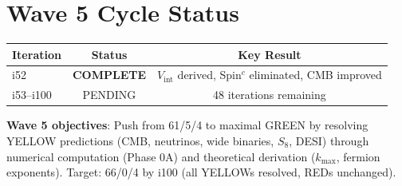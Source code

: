 \documentclass[11pt,a4paper]{article}
\begin{document}
\section{Wave 5 Cycle Status}

\begin{center}
\begin{tabular}{lcc}
\toprule
\textbf{Iteration} & \textbf{Status} & \textbf{Key Result} \\
\midrule
i52 & \textbf{COMPLETE} & $V_{\mathrm{int}}$ derived, Spin$^c$ eliminated, CMB improved \\
i53--i100 & PENDING & 48 iterations remaining \\
\bottomrule
\end{tabular}
\end{center}

\textbf{Wave 5 objectives}: Push from 61/5/4 to maximal GREEN by resolving YELLOW predictions (CMB, neutrinos, wide binaries, $S_8$, DESI) through numerical computation (Phase 0A) and theoretical derivation ($k_{\max}$, fermion exponents). Target: 66/0/4 by i100 (all YELLOWs resolved, REDs unchanged).
\end{document}
